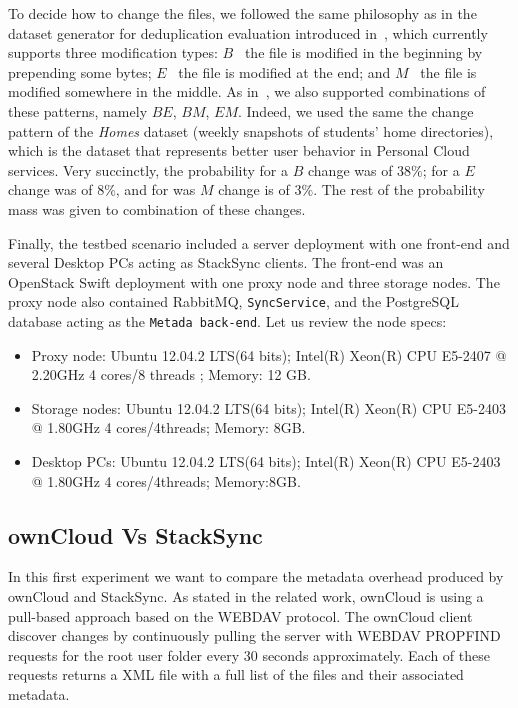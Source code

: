 To decide how to change the files, we followed the same philosophy as in the dataset generator for deduplication evaluation introduced in~\cite{Tarasov12}, which currently supports three modification types: $B$ \textemdash~the file is modified in the beginning by prepending some bytes; $E$ \textemdash~the file is modified at the end; and $M$ \textemdash~the file is modified somewhere in the middle. As in~\cite{Tarasov12}, we also supported combinations of these patterns, namely $BE$, $BM$, $EM$. Indeed, we used the same the change pattern of the \textit{Homes} dataset (weekly snapshots of students' home directories), which is the dataset that represents better user behavior in Personal Cloud services. Very succinctly, the probability for a $B$ change was of $38\%$; for a $E$ change was of $8\%$, and for was $M$ change is of $3\%$. The rest of the probability mass was given to combination of these changes.  

Finally, the testbed scenario included a server deployment with one front-end and several Desktop PCs acting as StackSync clients. The front-end was an OpenStack Swift deployment with one proxy node and three storage nodes. The proxy node also contained RabbitMQ, \texttt{SyncService}, and the PostgreSQL database acting as the \texttt{Metada back-end}. Let us review the node specs:
\begin{itemize}
\item Proxy node: Ubuntu 12.04.2 LTS(64 bits); Intel(R) Xeon(R) CPU E5-2407 @ 2.20GHz 4 cores/8 threads ; Memory: 12 GB.
\item Storage nodes: Ubuntu 12.04.2 LTS(64 bits);  Intel(R) Xeon(R) CPU E5-2403 @ 1.80GHz 4 cores/4threads; Memory: 8GB.
\item Desktop PCs: Ubuntu 12.04.2 LTS(64 bits); Intel(R) Xeon(R) CPU E5-2403  @ 1.80GHz 4 cores/4threads; Memory:8GB.
\end{itemize}


\subsection{ownCloud Vs StackSync}

In this first experiment we want to compare the metadata overhead produced by ownCloud and StackSync. As stated in the related work, ownCloud is using a pull-based approach based on the WEBDAV protocol. The ownCloud client discover changes by continuously pulling the server with WEBDAV PROPFIND requests for the root user folder every 30 seconds approximately. Each of these requests returns a XML file with a full list of the files and their associated metadata.


